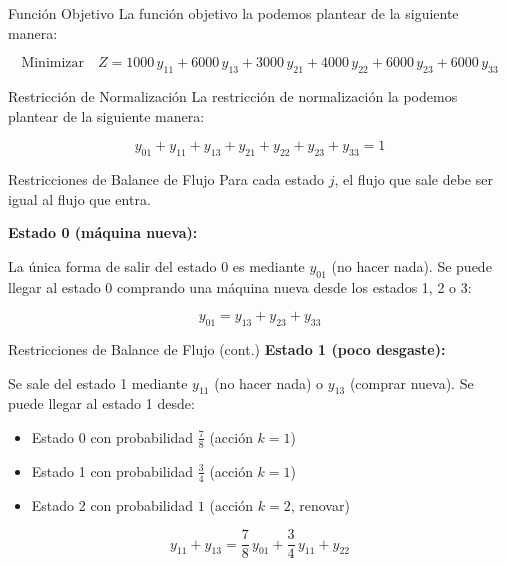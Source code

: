 \documentclass{beamer}
\begin{document}
\begin{frame}{Función Objetivo}
    \small
    La función objetivo la podemos plantear de la siguiente manera:

    \[
    \text{Minimizar} \quad Z = 1000\,y_{11} + 6000\,y_{13} + 3000\,y_{21} + 4000\,y_{22} + 6000\,y_{23} + 6000\,y_{33}
    \]
\end{frame}

\begin{frame}{Restricción de Normalización}
    \small
    La restricción de normalización la podemos plantear de la siguiente manera:

    \[
    y_{01} + y_{11} + y_{13} + y_{21} + y_{22} + y_{23} + y_{33} = 1
    \]
\end{frame}

\begin{frame}{Restricciones de Balance de Flujo}
    \small
    Para cada estado $j$, el flujo que sale debe ser igual al flujo que entra.

    \vspace{0.5em}

    \textbf{Estado 0 (máquina nueva):}

    \vspace{0.3em}

    La única forma de salir del estado 0 es mediante $y_{01}$ (no hacer nada). Se puede llegar al estado 0 comprando una máquina nueva desde los estados 1, 2 o 3:

    \[
    y_{01} = y_{13} + y_{23} + y_{33}
    \]
\end{frame}

\begin{frame}{Restricciones de Balance de Flujo (cont.)}
    \small
    \textbf{Estado 1 (poco desgaste):}

    \vspace{0.3em}

    Se sale del estado 1 mediante $y_{11}$ (no hacer nada) o $y_{13}$ (comprar nueva). Se puede llegar al estado 1 desde:
    \begin{itemize}
        \item Estado 0 con probabilidad $\frac{7}{8}$ (acción $k=1$)
        \item Estado 1 con probabilidad $\frac{3}{4}$ (acción $k=1$)
        \item Estado 2 con probabilidad $1$ (acción $k=2$, renovar)
    \end{itemize}

    \[
    y_{11} + y_{13} = \frac{7}{8}\,y_{01} + \frac{3}{4}\,y_{11} + y_{22}
    \]
\end{frame}
\end{document}
